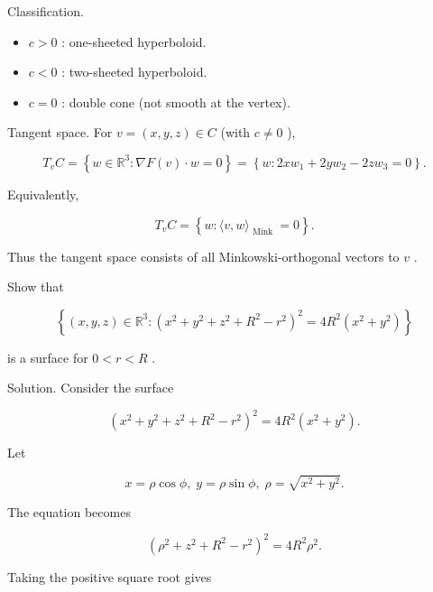 \documentclass[10pt]{article}
\begin{document}
Classification.

\begin{itemize}\relax
\item\relax \(c > 0\) : one-sheeted hyperboloid.
\end{itemize}

\begin{itemize}\relax
\item\relax \(c < 0\) : two-sheeted hyperboloid.
\end{itemize}

\begin{itemize}\relax
\item\relax \(c = 0\) : double cone (not smooth at the vertex).
\end{itemize}

Tangent space. For \(v = \left( {x,y,z}\right)  \in  C\) (with \(c \neq  0\) ),

\[
{T}_{v}C = \left\{  {w \in  {\mathbb{R}}^{3} : \nabla F\left( v\right)  \cdot  w = 0}\right\}   = \left\{  {w : {2x}{w}_{1} + {2y}{w}_{2} - {2z}{w}_{3} = 0}\right\}  .
\]

Equivalently,

\[
{T}_{v}C = \left\{  {w : \langle v,w{\rangle }_{\text{ Mink }} = 0}\right\}  .
\]

Thus the tangent space consists of all Minkowski-orthogonal vectors to \(v\) .

\begin{problem}[title=PROBLEM 4 (4 POINTS)]
Show that

\[
\left\{  {\left( {x,y,z}\right)  \in  {\mathbb{R}}^{3} : {\left( {x}^{2} + {y}^{2} + {z}^{2} + {R}^{2} - {r}^{2}\right) }^{2} = 4{R}^{2}\left( {{x}^{2} + {y}^{2}}\right) }\right\}
\]

is a surface for \(0 < r < R\) .
\end{problem}

Solution. Consider the surface

\[
{\left( {x}^{2} + {y}^{2} + {z}^{2} + {R}^{2} - {r}^{2}\right) }^{2} = 4{R}^{2}\left( {{x}^{2} + {y}^{2}}\right) .
\]

Let

\[
x = \rho \cos \phi ,\;y = \rho \sin \phi ,\;\rho  = \sqrt{{x}^{2} + {y}^{2}}.
\]

The equation becomes

\[
{\left( {\rho }^{2} + {z}^{2} + {R}^{2} - {r}^{2}\right) }^{2} = 4{R}^{2}{\rho }^{2}.
\]

Taking the positive square root gives
\end{document}
